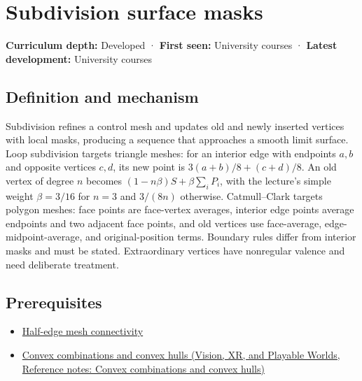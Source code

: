\hypertarget{appendix-0234ab7f86b1}{}\label{referencestart:appendix-0234ab7f86b1}
\section{Subdivision surface masks}\label{appendix-0234ab7f86b1-subdivision-surface-masks}

\textbf{Curriculum depth:} Developed · \textbf{First seen:} University courses · \textbf{Latest development:} University courses

\begin{allmightroledefinition}

\subsection{Definition and mechanism}\label{appendix-0234ab7f86b1-definition-and-mechanism}

Subdivision refines a control mesh and updates old and newly inserted vertices with local masks, producing a sequence that approaches a smooth limit surface. Loop subdivision targets triangle meshes: for an interior edge with endpoints \(a,b\) and opposite vertices \(c,d\), its new point is \(3(a+b)/8+(c+d)/8\). An old vertex of degree \(n\) becomes \((1-n\beta)S+\beta\sum_iP_i\), with the lecture's simple weight \(\beta=3/16\) for \(n=3\) and \(3/(8n)\) otherwise. Catmull--Clark targets polygon meshes: face points are face-vertex averages, interior edge points average endpoints and two adjacent face points, and old vertices use face-average, edge-midpoint-average, and original-position terms. Boundary rules differ from interior masks and must be stated. Extraordinary vertices have nonregular valence and need deliberate treatment.

\end{allmightroledefinition}

\subsection{Prerequisites}\label{appendix-0234ab7f86b1-prerequisites}

\begin{itemize}
\tightlist
\item
  \hyperref[appendix-1aea26b2307f]{Half-edge mesh connectivity}
\item
  \href{../07-Vision-XR-and-Playable-Worlds/main.pdf\#nameddest=appendix-0026ec42c9d5}{Convex combinations and convex hulls (Vision, XR, and Playable Worlds, Reference notes: Convex combinations and convex hulls)}
\end{itemize}

